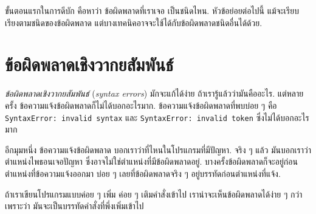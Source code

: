 
ขั้นตอนแรกในการดีบัก คือหาว่า ข้อผิดพลาดที่เราเจอ เป็นชนิดไหน.
หัวข้อย่อยต่อไปนี้ แม้จะเรียบเรียงตามชนิดของข้อผิดพลาด 
แต่บางเทคนิคอาจจะใช้ได้กับข้อผิดพลาดชนิดอื่นได้ด้วย.

\section{ข้อผิดพลาดเชิงวากยสัมพันธ์}


\textit{ข้อผิดพลาดเชิงวากยสัมพันธ์} (\textit{syntax errors}) มักจะแก้ได้ง่าย ถ้าเรารู้แล้วว่ามันคืออะไร.
แต่หลายครั้ง ข้อความแจ้งข้อผิดพลาดก็ไม่ได้บอกอะไรมาก.
ข้อความแจ้งข้อผิดพลาดที่พบบ่อย ๆ คือ 
\texttt{SyntaxError: invalid syntax}
และ
\texttt{SyntaxError: invalid token} 
ซึ่งไม่ได้บอกอะไรมาก


อีกมุมหนึ่ง ข้อความแจ้งข้อผิดพลาด บอกเราว่าที่ไหนในโปรแกรมที่มีปัญหา.
จริง ๆ แล้ว มันบอกเราว่าตำแหน่งไพธอนเจอปัญหา ซึ่งอาจไม่ใช่ตำแหน่งที่มีข้อผิดพลาดอยู่.
บางครั้งข้อผิดพลาดก็จะอยู่ก่อนตำแหน่งที่ข้อความแจ้งออกมา
บ่อย ๆ เลยที่ข้อผิดพลาดจริง ๆ อยู่บรรทัดก่อนตำแหน่งที่แจ้ง.




ถ้าเราเขียนโปรแกรมแบบค่อย ๆ เพิ่ม ค่อย ๆ เติมคำสั่งเข้าไป
เราน่าจะเห็นข้อผิดพลาดได้ง่าย ๆ กว่า
เพราะว่า มันจะเป็นบรรทัดคำสั่งที่พึ่งเพิ่มเข้าไป

